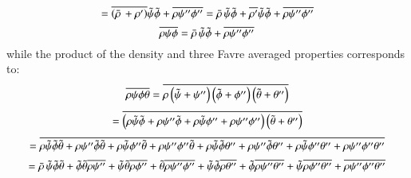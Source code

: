\documentclass{warpdoc}
\newcommand{\mfd}{\displaystyle}
\begin{document}
%
\begin{displaymath}
   = \mfd \overline{\left( \wbar{\rho}\, + \rho^{\prime} \right)} {\wtilde{\psi}} {\wtilde{\phi}}
            +\overline{\rho \psi^{\prime\prime} \phi^{\prime\prime}}
   = \mfd \wbar{\rho}\, {\wtilde{\psi}} {\wtilde{\phi}} + \overline{\rho^{\prime}} {\wtilde{\psi}} {\wtilde{\phi}}
            +\overline{\rho \psi^{\prime\prime} \phi^{\prime\prime}}
\end{displaymath}
%
\begin{equation}
  \mfd\overline{\rho \psi \phi}
      = \mfd \wbar{\rho}\, {\wtilde{\psi}} {\wtilde{\phi}}
            +\overline{\rho \psi^{\prime\prime} \phi^{\prime\prime}}
  \label{eqn:favre-mult-2term}
\end{equation}
%
while the product of the density and three Favre averaged properties
corresponds to:
%
\begin{displaymath}
  \mfd\overline{\rho \psi \phi \theta} = \overline{\rho
       \left( {\wtilde{\psi}}+\psi^{\prime\prime} \right)
       \left( {\wtilde{\phi}}+\phi^{\prime\prime} \right)
       \left( \wtilde{\theta}+\theta^{\prime\prime} \right) }
\end{displaymath}
%
\begin{displaymath}
   = \mfd\overline{
     \left( \rho {\wtilde{\psi}} {\wtilde{\phi}}+\rho \psi^{\prime\prime} {\wtilde{\phi}}
            +\rho {\wtilde{\psi}} \phi^{\prime\prime}+\rho \psi^{\prime\prime} \phi^{\prime\prime}
     \right)
     \left(
            \wtilde{\theta}+\theta^{\prime\prime}
     \right)
     }
\end{displaymath}
%
\begin{displaymath}
   = \mfd\overline{
      \rho {\wtilde{\psi}} {\wtilde{\phi}} \wtilde{\theta}+\rho \psi^{\prime\prime} {\wtilde{\phi}} \wtilde{\theta}
            +\rho {\wtilde{\psi}} \phi^{\prime\prime} \wtilde{\theta}+\rho \psi^{\prime\prime} \phi^{\prime\prime} \wtilde{\theta}
      +\rho {\wtilde{\psi}} {\wtilde{\phi}} \theta^{\prime\prime}+\rho \psi^{\prime\prime} {\wtilde{\phi}} \theta^{\prime\prime}
            +\rho {\wtilde{\psi}} \phi^{\prime\prime} \theta^{\prime\prime}+\rho \psi^{\prime\prime} \phi^{\prime\prime} \theta^{\prime\prime}
     }
\end{displaymath}
%
\begin{displaymath}
   = \mfd\wbar{\rho}\, {\wtilde{\psi}} {\wtilde{\phi}} \wtilde{\theta}
         +{\wtilde{\phi}} \wtilde{\theta} \overline{\rho \psi^{\prime\prime}}
       +{\wtilde{\psi}} \wtilde{\theta} \overline{\rho \phi^{\prime\prime}}
       +\wtilde{\theta} \overline{\rho \psi^{\prime\prime} \phi^{\prime\prime}}
       +{\wtilde{\psi}} {\wtilde{\phi}} \overline{\rho \theta^{\prime\prime}}
       +{\wtilde{\phi}} \overline{\rho \psi^{\prime\prime} \theta^{\prime\prime}}
       +{\wtilde{\psi}} \overline{\rho \phi^{\prime\prime} \theta^{\prime\prime}}
       +\overline{\rho \psi^{\prime\prime} \phi^{\prime\prime} \theta^{\prime\prime}}
\end{displaymath}
\end{document}
